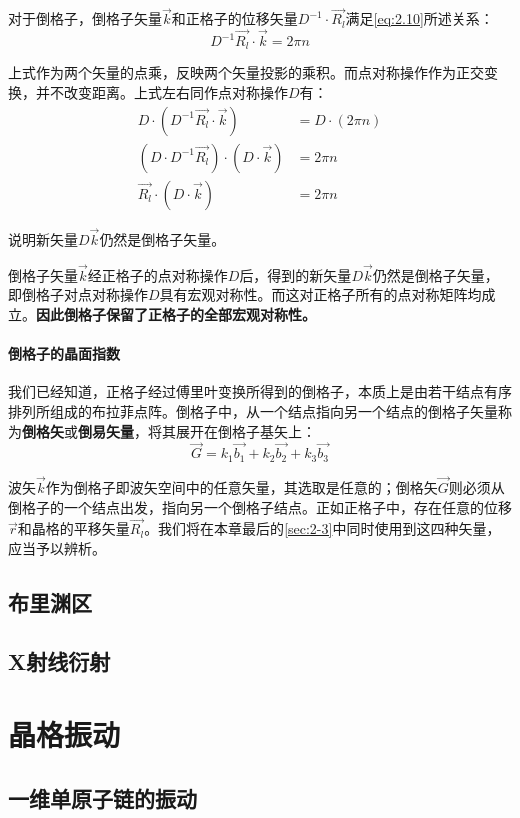     对于倒格子，倒格子矢量$\vec{k}$和正格子的位移矢量$D^{-1}\cdot \vec{R_l}$满足\autoref{eq:2.10}所述关系：
    \[
    D^{-1}\vec{R_l}\cdot\vec{k}=2\pi n
    \]

    上式作为两个矢量的点乘，反映两个矢量投影的乘积。而点对称操作作为正交变换，并不改变距离。上式左右同作点对称操作$D$有：
    \begin{align*}
    D\cdot (D^{-1}\vec{R_l}\cdot\vec{k}) &= D\cdot(2\pi n)\\
    (D\cdot D^{-1}\vec{R_l}) \cdot (D\cdot\vec{k}) &= 2\pi n\\
    \vec{R_l} \cdot (D\cdot\vec{k}) &= 2\pi n
    \end{align*}

    说明新矢量$D\vec{k}$仍然是倒格子矢量。
    
    倒格子矢量$\vec{k}$经正格子的点对称操作$D$后，得到的新矢量$D\vec{k}$仍然是倒格子矢量，即倒格子对点对称操作$D$具有宏观对称性。而这对正格子所有的点对称矩阵均成立。\textbf{因此倒格子保留了正格子的全部宏观对称性。}

\subsubsection{倒格子的晶面指数}
    我们已经知道，正格子经过傅里叶变换所得到的倒格子，本质上是由若干结点有序排列所组成的布拉菲点阵。倒格子中，从一个结点指向另一个结点的倒格子矢量称为\textbf{倒格矢}或\textbf{倒易矢量}，将其展开在倒格子基矢上：
    \[
    \vec{G}=k_1\vec{b_1}+k_2\vec{b_2}+k_3\vec{b_3}
    \]

    波矢$\vec{k}$作为倒格子即波矢空间中的任意矢量，其选取是任意的；倒格矢$\vec{G}$则必须从倒格子的一个结点出发，指向另一个倒格子结点。正如正格子中，存在任意的位移$\vec{r}$和晶格的平移矢量$\vec{R_l}$。我们将在本章最后的\autoref{sec:2-3}中同时使用到这四种矢量，应当予以辨析。

    


\section{布里渊区}
\section{X射线衍射}\label{sec:2-3}

\chapter{晶格振动}\label{chap:3}
\section{一维单原子链的振动}
